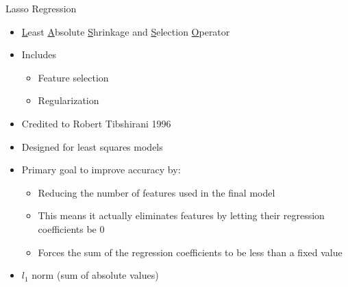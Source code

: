\documentclass[aspectratio=169]{beamer}
\begin{document}
\begin{frame}{ Lasso Regression}
	\begin{itemize}
	\item \underline{L}east \underline{A}bsolute \underline{S}hrinkage and \underline{S}election \underline{O}perator
	\item Includes
	\begin{itemize}
	\item Feature selection
	\item Regularization
	\end{itemize}
	\item Credited to Robert Tibshirani 1996
	\item Designed for least squares models
	\item Primary goal to improve accuracy by:
	\begin{itemize}
	\item Reducing the number of features used in the final model
	\item This means it actually eliminates features by letting their regression coefficients be 0
	\item Forces the sum of the regression coefficients to be less than a fixed value
	\end{itemize}
	\item $l_1$ norm (sum of absolute values)
\end{itemize}
\end{frame}
\end{document}
